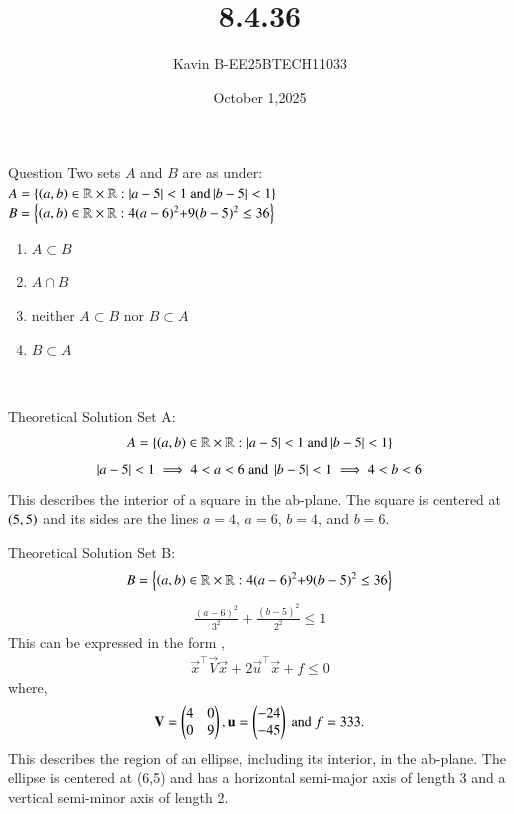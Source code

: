 \documentclass{beamer}
\begin{document}
\title 
{8.4.36}
\date{October 1,2025}


\author 
{Kavin B-EE25BTECH11033}






\frame{\titlepage}
\begin{frame}{Question}
Two sets $A$ and $B$ are as under:
$A=\left\{\left(a,b\right)\in\mathbb{R}\times\mathbb{R}:\left\vert a-5\right\vert<1\text{ and} \left\vert b-5\right\vert<1\right\}$
$B=\left\{\left(a,b\right)\in\mathbb{R}\times\mathbb{R}:4(a-6)^2\text{+}9(b-5)^2\leq36\right\}$

			\begin{multicols}
	\begin{enumerate}
		\item $A\subset B$ 
		\item $A\cap B$
		\item neither $A\subset B$ nor $B\subset A$
		\item $B\subset A$
	\end{enumerate}\end{multicols}\\    
\bigskip
\end{frame}



\begin{frame}{Theoretical Solution}
Set A:
\begin{align}
    A=\left\{\left(a,b\right)\in\mathbb{R}\times\mathbb{R}:\left\vert a-5\right\vert<1\text{ and} \left\vert b-5\right\vert<1\right\}
\end{align}
\begin{align}
    \left\vert a-5\right\vert<1\implies4<a<6 \text{ and } \left\vert b-5\right\vert<1\implies4<b<6
\end{align}
This describes the interior of a square in the ab-plane. The square is centered at $\left(5,5\right)$ and its sides are the lines $a=4$, $a=6$, $b=4$, and $b=6$.\\
\bigskip 


\end{frame}

\begin{frame}{Theoretical Solution}
Set B:
\begin{align}
    B=\left\{\left(a,b\right)\in\mathbb{R}\times\mathbb{R}:4(a-6)^2\text{+}9(b-5)^2\leq36\right\}
\end{align}
\begin{align}
    \frac{(a-6)^2}{3^2} + \frac{(b-5)^2}{2^2} \leq 1
\end{align}
This can be expressed in the form ,
\begin{align*}
\vec{x}^{\top}\vec{V}\vec{x}+2\vec{u}^{\top}\vec{x}+f\leq0
\end{align*}
where,
\begin{align}
    \mathbf{V} = \begin{pmatrix}4 & 0\\0 & 9\end{pmatrix} , \mathbf{u} = \begin{pmatrix}-24\\-45\end{pmatrix} \text{ and } f=333.  
\end{align}
This describes the region of an ellipse, including its interior, in the ab-plane. The ellipse is centered at (6,5) and has a horizontal semi-major axis of length 3 and a vertical semi-minor axis of length 2.\\
\bigskip
\end{frame}
\end{document}
